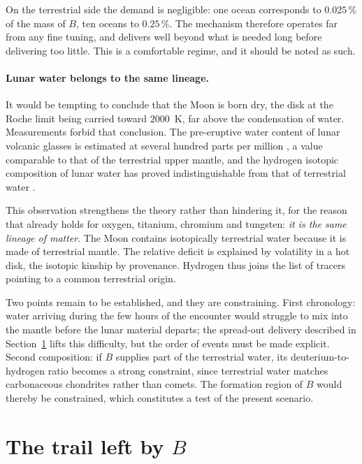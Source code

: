 \documentclass[11pt,a4paper,openany]{report}
\begin{document}
On the terrestrial side the demand is negligible: one ocean corresponds to $0.025\,\%$ of the mass of
$B$, ten oceans to $0.25\,\%$. The mechanism therefore operates far from any fine tuning, and
delivers well beyond what is needed long before delivering too little. This is a comfortable regime,
and it should be noted as such.

\paragraph{Lunar water belongs to the same lineage.} It would be tempting to conclude that the Moon
is born dry, the disk at the Roche limit being carried toward $2000$~K, far above the condensation
of water. Measurements forbid that conclusion. The pre-eruptive water content of lunar volcanic
glasses is estimated at several hundred parts per million \cite{Saal2008}, a value comparable to that
of the terrestrial upper mantle, and the hydrogen isotopic composition of lunar water has proved
indistinguishable from that of terrestrial water \cite{Saal2013}.

This observation strengthens the theory rather than hindering it, for the reason that already holds
for oxygen, titanium, chromium and tungsten: \emph{it is the same lineage of matter}. The Moon
contains isotopically terrestrial water because it is made of terrestrial mantle. The relative
deficit is explained by volatility in a hot disk, the isotopic kinship by provenance. Hydrogen thus
joins the list of tracers pointing to a common terrestrial origin.

\begin{controle}
Two points remain to be established, and they are constraining. First chronology: water arriving
during the few hours of the encounter would struggle to mix into the mantle before the lunar
material departs; the spread-out delivery described in Section~\ref{sec:trainee} lifts this
difficulty, but the order of events must be made explicit. Second composition: if $B$ supplies part
of the terrestrial water, its deuterium-to-hydrogen ratio becomes a strong constraint, since
terrestrial water matches carbonaceous chondrites rather than comets. The formation region of $B$
would thereby be constrained, which constitutes a test of the present scenario.
\end{controle}

\section{The trail left by \texorpdfstring{$B$}{B}}
\label{sec:trainee}
\end{document}

